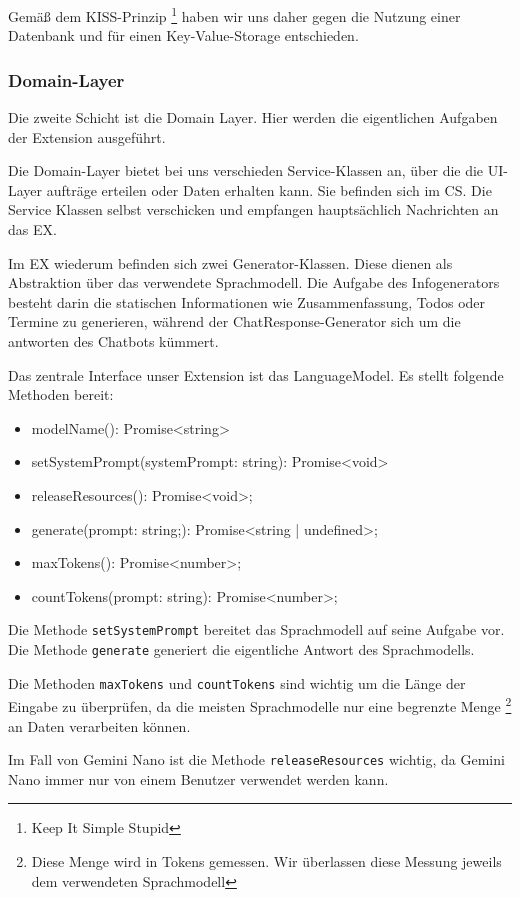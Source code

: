   Gemäß dem KISS-Prinzip \footnote{Keep It Simple Stupid} haben wir uns daher gegen die Nutzung einer Datenbank und für einen Key-Value-Storage entschieden.

  \subsubsection{Domain-Layer}
  Die zweite Schicht ist die Domain Layer. Hier werden die eigentlichen Aufgaben der Extension ausgeführt.

  Die Domain-Layer bietet bei uns verschieden Service-Klassen an, über die die UI-Layer aufträge erteilen oder Daten erhalten kann. Sie befinden sich im CS. Die Service Klassen selbst verschicken und empfangen hauptsächlich Nachrichten an das EX.

  Im EX wiederum befinden sich zwei Generator-Klassen. Diese dienen als Abstraktion über das verwendete Sprachmodell. Die Aufgabe des Infogenerators besteht darin die statischen Informationen wie Zusammenfassung, Todos oder Termine zu generieren, während der ChatResponse-Generator sich um die antworten des Chatbots kümmert.

  Das zentrale Interface unser Extension ist das LanguageModel. Es stellt folgende Methoden bereit:

  \begin{itemize}
    \item modelName(): Promise<string>
    \item setSystemPrompt(systemPrompt: string): Promise<void>
    \item releaseResources(): Promise<void>;
    \item generate(prompt: string;): Promise<string | undefined>;
    \item maxTokens(): Promise<number>;
    \item countTokens(prompt: string): Promise<number>;
  \end{itemize}

  Die Methode \texttt{setSystemPrompt} bereitet das Sprachmodell auf seine Aufgabe vor. Die Methode \texttt{generate} generiert die eigentliche Antwort des Sprachmodells.

  Die Methoden \texttt{maxTokens} und \texttt{countTokens} sind wichtig um die Länge der Eingabe zu überprüfen, da die meisten Sprachmodelle nur eine begrenzte Menge \footnote{Diese Menge wird in Tokens gemessen. Wir überlassen diese Messung jeweils dem verwendeten Sprachmodell} an Daten verarbeiten können.

  Im Fall von Gemini Nano ist die Methode \texttt{releaseResources} wichtig, da Gemini Nano immer nur von einem Benutzer verwendet werden kann.


